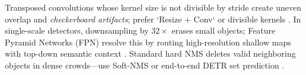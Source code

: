 \documentclass[../../../../master.tex]{subfiles}
\begin{document}
\begin{pitfall}
Transposed convolutions whose kernel size is not divisible by stride create uneven overlap and \emph{checkerboard artifacts}; prefer `Resize + Conv` or divisible kernels . In single-scale detectors, downsampling by $32\times$ erases small objects; Feature Pyramid Networks (FPN) resolve this by routing high-resolution shallow maps with top-down semantic context . Standard hard NMS deletes valid neighboring objects in dense crowds—use Soft-NMS or end-to-end DETR set prediction .
\end{pitfall}
\end{document}
